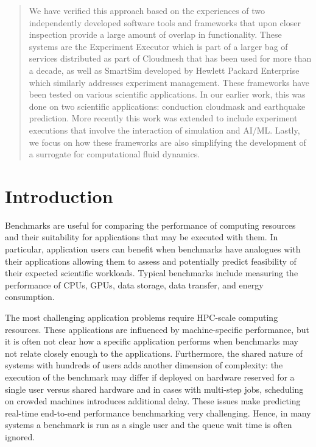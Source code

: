 \documentclass[sigconf]{acmart}
\begin{document}
\begin{abstract}
We have verified this approach based on the experiences of two independently developed software tools and frameworks that upon closer inspection provide a large amount of overlap in functionality. These systems are the Experiment Executor which is part of a larger bag of services distributed as part of Cloudmesh that has been used for more than a decade, as well as SmartSim developed by Hewlett Packard Enterprise which similarly addresses experiment management. These frameworks have been tested on various scientific applications. In our earlier work, this was done on two scientific applications: conduction cloudmask and earthquake prediction. More recently this work was extended to include experiment executions that involve the interaction of simulation and AI/ML. Lastly, we focus on how these frameworks are also simplifying the development of a surrogate for computational fluid dynamics.


\tiny {}


\end{abstract}


\section{Introduction}
\label{sec:introduction}

Benchmarks are useful for comparing the performance of computing resources and their suitability for applications that may be executed with them. In particular, application users can benefit when benchmarks have analogues with their applications allowing them to assess and potentially predict feasibility of their expected scientific workloads. Typical benchmarks include measuring the performance of CPUs, GPUs, data storage, data transfer, and energy consumption.

The most challenging application problems require HPC-scale computing resources. These applications are influenced by machine-specific performance, but it is often not clear how a specific application performs when benchmarks may not relate closely enough to the applications. Furthermore, the shared nature of systems with hundreds of users  adds another dimension of complexity: the execution of the benchmark may differ if deployed on hardware reserved for a single user versus shared hardware and in cases with multi-step jobs, scheduling on crowded machines introduces additional delay. These issues make predicting real-time end-to-end performance benchmarking very challenging. Hence, in many systems a benchmark is run as a single user and the queue wait time is often ignored.
\end{document}
